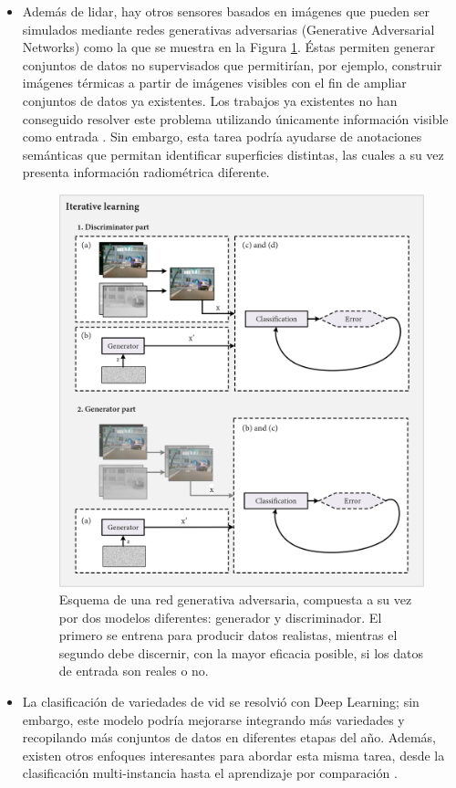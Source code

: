 \begin{itemize}
    \item Además de \acrshort{lidar}, hay otros sensores basados en imágenes que pueden ser simulados mediante redes generativas adversarias (Generative Adversarial Networks) como la que se muestra en la Figura \ref{fig:conclusiones_gan}. Éstas permiten generar conjuntos de datos no supervisados que permitirían, por ejemplo, construir imágenes térmicas a partir de imágenes visibles con el fin de ampliar conjuntos de datos ya existentes. Los trabajos ya existentes no han conseguido resolver este problema utilizando únicamente información visible como entrada \cite{li_multi-branch_2019, li_i-gans_2021, kniaz_thermalgan_2019, ozkanoglu_infragan_2022, yi_cycle_2023}. Sin embargo, esta tarea podría ayudarse de anotaciones semánticas que permitan identificar superficies distintas, las cuales a su vez presenta información radiométrica diferente.
    \begin{figure}[ht]
        \centering
        \includegraphics[width=\linewidth]{figs/conclusions/gan.png}
        \caption{Esquema de una red generativa adversaria, compuesta a su vez por dos modelos diferentes: generador y discriminador. El primero se entrena para producir datos realistas, mientras el segundo debe discernir, con la mayor eficacia posible, si los datos de entrada son reales o no.}
        \label{fig:conclusiones_gan}
    \end{figure}
    \item La clasificación de variedades de vid se resolvió con Deep Learning; sin embargo, este modelo podría mejorarse integrando más variedades y recopilando más conjuntos de datos en diferentes etapas del año. Además, existen otros enfoques interesantes para abordar esta misma tarea, desde la clasificación multi-instancia \cite{meerdink_multitarget_2022} hasta el aprendizaje por comparación \cite{guan_spatial-spectral_2022}. 
\end{itemize}

